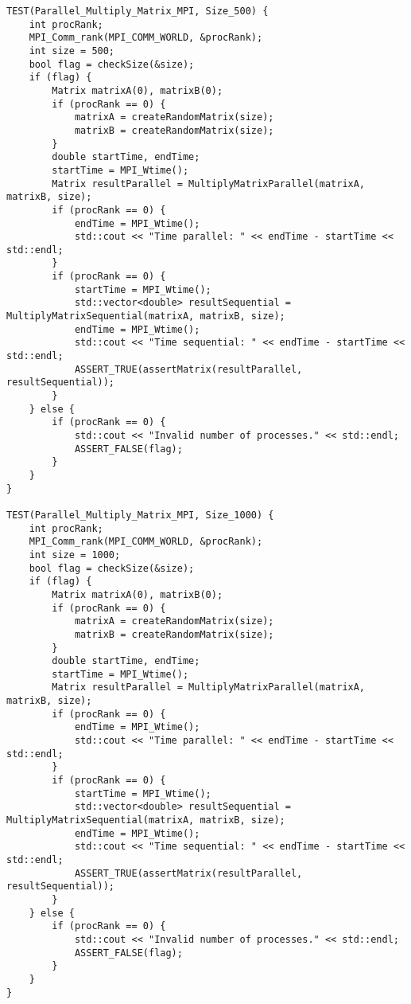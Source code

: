 \documentclass{report}
\begin{document}
\begin{lstlisting}
TEST(Parallel_Multiply_Matrix_MPI, Size_500) {
    int procRank;
    MPI_Comm_rank(MPI_COMM_WORLD, &procRank);
    int size = 500;
    bool flag = checkSize(&size);
    if (flag) {
        Matrix matrixA(0), matrixB(0);
        if (procRank == 0) {
            matrixA = createRandomMatrix(size);
            matrixB = createRandomMatrix(size);
        }
        double startTime, endTime;
        startTime = MPI_Wtime();
        Matrix resultParallel = MultiplyMatrixParallel(matrixA, matrixB, size);
        if (procRank == 0) {
            endTime = MPI_Wtime();
            std::cout << "Time parallel: " << endTime - startTime << std::endl;
        }
        if (procRank == 0) {
            startTime = MPI_Wtime();
            std::vector<double> resultSequential = MultiplyMatrixSequential(matrixA, matrixB, size);
            endTime = MPI_Wtime();
            std::cout << "Time sequential: " << endTime - startTime << std::endl;
            ASSERT_TRUE(assertMatrix(resultParallel, resultSequential));
        }
    } else {
        if (procRank == 0) {
            std::cout << "Invalid number of processes." << std::endl;
            ASSERT_FALSE(flag);
        }
    }
}

TEST(Parallel_Multiply_Matrix_MPI, Size_1000) {
    int procRank;
    MPI_Comm_rank(MPI_COMM_WORLD, &procRank);
    int size = 1000;
    bool flag = checkSize(&size);
    if (flag) {
        Matrix matrixA(0), matrixB(0);
        if (procRank == 0) {
            matrixA = createRandomMatrix(size);
            matrixB = createRandomMatrix(size);
        }
        double startTime, endTime;
        startTime = MPI_Wtime();
        Matrix resultParallel = MultiplyMatrixParallel(matrixA, matrixB, size);
        if (procRank == 0) {
            endTime = MPI_Wtime();
            std::cout << "Time parallel: " << endTime - startTime << std::endl;
        }
        if (procRank == 0) {
            startTime = MPI_Wtime();
            std::vector<double> resultSequential = MultiplyMatrixSequential(matrixA, matrixB, size);
            endTime = MPI_Wtime();
            std::cout << "Time sequential: " << endTime - startTime << std::endl;
            ASSERT_TRUE(assertMatrix(resultParallel, resultSequential));
        }
    } else {
        if (procRank == 0) {
            std::cout << "Invalid number of processes." << std::endl;
            ASSERT_FALSE(flag);
        }
    }
}


\end{lstlisting}
\end{document}
